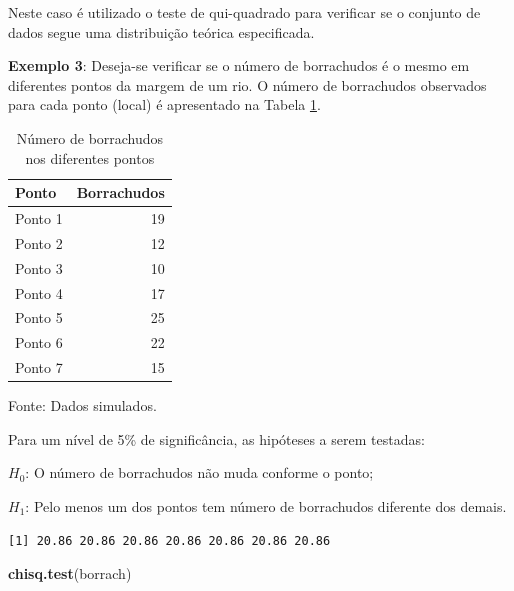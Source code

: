 \documentclass[12pt,brazil,oneside]{book}
\newenvironment{Shaded}{\begin{snugshade}}{\end{snugshade}}
\newcommand{\DecValTok}[1]{\textcolor[rgb]{0.00,0.00,0.81}{#1}}
\newcommand{\KeywordTok}[1]{\textcolor[rgb]{0.13,0.29,0.53}{\textbf{#1}}}
\newcommand{\NormalTok}[1]{#1}
\newcommand{\OperatorTok}[1]{\textcolor[rgb]{0.81,0.36,0.00}{\textbf{#1}}}
\begin{document}
Neste caso é utilizado o teste de qui-quadrado para verificar se o conjunto de dados segue uma distribuição teórica especificada.

\textbf{Exemplo 3}: Deseja-se verificar se o número de borrachudos é o mesmo em diferentes pontos da margem de um rio. O número de borrachudos observados para cada ponto (local) é apresentado na Tabela \ref{tab:borrach}.

\begin{table}[t]

\caption{\label{tab:borrach}Número de borrachudos nos diferentes pontos}
\centering
\begin{tabular}{l|r}
\hline
Ponto & Borrachudos\\
\hline
Ponto 1 & 19\\
\hline
Ponto 2 & 12\\
\hline
Ponto 3 & 10\\
\hline
Ponto 4 & 17\\
\hline
Ponto 5 & 25\\
\hline
Ponto 6 & 22\\
\hline
Ponto 7 & 15\\
\hline
\end{tabular}
\end{table}

Fonte: Dados simulados.

Para um nível de 5\% de significância, as hipóteses a serem testadas:

\(H_0\): O número de borrachudos não muda conforme o ponto;

\(H_1\): Pelo menos um dos pontos tem número de borrachudos diferente dos demais.

\begin{Shaded}
\end{Shaded}

\begin{verbatim}
[1] 20.86 20.86 20.86 20.86 20.86 20.86 20.86
\end{verbatim}

\begin{Shaded}
\begin{Highlighting}[]
\KeywordTok{chisq.test}\NormalTok{(borrach)}
\end{Highlighting}
\end{Shaded}
\end{document}
